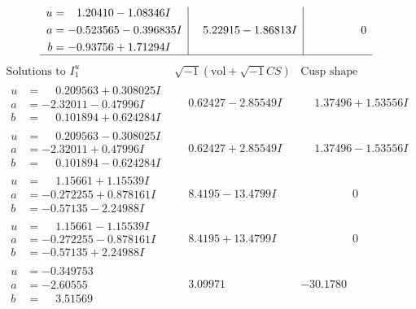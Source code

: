 \documentclass[1p]{elsarticle_modified}
\theoremstyle{definition}
\newcommand{\I}{\sqrt{-1}}
\begin{document}
$$\begin{array}{c|c|c}
\begin{aligned}
u &= \phantom{-}1.20410 - 1.08346 I \\
a &= -0.523565 - 0.396835 I \\
b &= -0.93756 + 1.71294 I\end{aligned}
 & \phantom{-}5.22915 - 1.86813 I & \phantom{-0.000000 } 0\\
 \hline 
 \end{array}$$\newpage$$\begin{array}{c|c|c}  
\text{Solutions to }I^u_{1}& \I (\text{vol} + \sqrt{-1}CS) & \text{Cusp shape}\\
 \hline 
\begin{aligned}
u &= \phantom{-}0.209563 + 0.308025 I \\
a &= -2.32011 - 0.47996 I \\
b &= \phantom{-}0.101894 + 0.624284 I\end{aligned}
 & \phantom{-}0.62427 - 2.85549 I & \phantom{-}1.37496 + 1.53556 I \\ \hline\begin{aligned}
u &= \phantom{-}0.209563 - 0.308025 I \\
a &= -2.32011 + 0.47996 I \\
b &= \phantom{-}0.101894 - 0.624284 I\end{aligned}
 & \phantom{-}0.62427 + 2.85549 I & \phantom{-}1.37496 - 1.53556 I \\ \hline\begin{aligned}
u &= \phantom{-}1.15661 + 1.15539 I \\
a &= -0.272255 + 0.878161 I \\
b &= -0.57135 - 2.24988 I\end{aligned}
 & \phantom{-}8.4195 - 13.4799 I & \phantom{-0.000000 } 0 \\ \hline\begin{aligned}
u &= \phantom{-}1.15661 - 1.15539 I \\
a &= -0.272255 - 0.878161 I \\
b &= -0.57135 + 2.24988 I\end{aligned}
 & \phantom{-}8.4195 + 13.4799 I & \phantom{-0.000000 } 0 \\ \hline\begin{aligned}
u &= -0.349753\phantom{ +0.000000I} \\
a &= -2.60555\phantom{ +0.000000I} \\
b &= \phantom{-}3.51569\phantom{ +0.000000I}\end{aligned}
 & \phantom{-}3.09971\phantom{ +0.000000I} & -30.1780\phantom{ +0.000000I} \\ \hline\begin{aligned}

\end{aligned}
\end{array}$$
\end{document}

